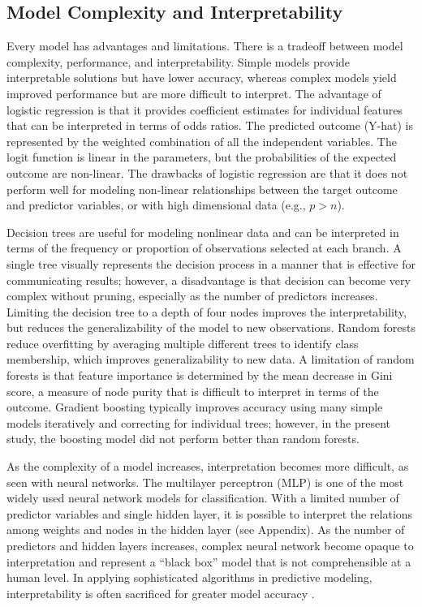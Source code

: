 \subsection{Model Complexity and Interpretability}

Every  model has advantages and limitations. There is a 
tradeoff between model complexity, performance, and interpretability.
Simple models provide interpretable solutions but have lower accuracy, 
whereas complex models yield improved performance but are more difficult 
to interpret. The advantage of logistic regression is that it provides 
coefficient estimates for individual features that can be interpreted in 
terms of odds ratios. The predicted outcome (Y-hat) is represented by the
weighted combination of all the independent variables. The logit function 
is linear in the parameters, but the probabilities of the expected outcome 
are non-linear. The drawbacks of logistic regression are that it does not 
perform well for modeling non-linear relationships between the target
outcome and predictor variables, or with high dimensional data (e.g., $p>n$). 

Decision trees are useful for modeling nonlinear data and can be 
interpreted in terms of the frequency or proportion of observations selected 
at each branch. A single tree visually represents the decision process in a 
manner that is effective for communicating results; however, a disadvantage 
is that decision can become very complex without pruning, especially as the 
number of predictors increases. Limiting the decision tree to a depth of four 
nodes improves the interpretability, but reduces the generalizability of the 
model to new observations. Random forests reduce overfitting by averaging
multiple different trees to identify class membership, which improves 
generalizability to new data. A limitation of random forests is that feature 
importance is determined by the mean decrease in Gini score, a measure of node
purity that is difficult to interpret in terms of the outcome. Gradient 
boosting typically improves accuracy using many simple models iteratively and 
correcting for individual trees; however, in the present study, the boosting 
model did not perform better than random forests. 

As the complexity of a model increases, interpretation becomes more difficult, 
as seen with neural networks. The multilayer perceptron (MLP) is one of the 
most widely used neural network models for classification. With a limited 
number of predictor variables and single hidden layer, it is possible to 
interpret the relations among weights and nodes in the hidden layer 
(see Appendix). As the number of predictors and hidden layers increases, 
complex neural network become opaque to interpretation and represent a 
``black box'' model that is not comprehensible at a human level. In 
applying sophisticated algorithms in predictive modeling, interpretability 
is often sacrificed for greater model accuracy \cite{elgin18}. 
